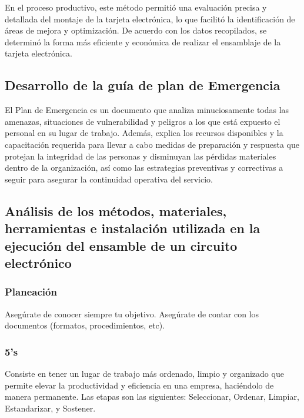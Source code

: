     En el proceso productivo, este método permitió una evaluación precisa y detallada del montaje de la tarjeta electrónica, lo que facilitó la identificación de áreas de mejora y optimización. De acuerdo con los datos recopilados, se determinó la forma más eficiente y económica de realizar el ensamblaje de la tarjeta electrónica.
    \subsection{Desarrollo de la guía de plan de Emergencia}
    
    El Plan de Emergencia es un documento que analiza minuciosamente todas las amenazas, situaciones de vulnerabilidad y peligros a los que está expuesto el personal en su lugar de trabajo. Además, explica los recursos disponibles y la capacitación requerida para llevar a cabo medidas de preparación y respuesta que protejan la integridad de las personas y disminuyan las pérdidas materiales dentro de la organización, así como las estrategias preventivas y correctivas a seguir para asegurar la continuidad operativa del servicio.
    \subsection{Análisis de los métodos, materiales, herramientas e instalación utilizada en la ejecución del ensamble de un circuito electrónico}
    
    \subsubsection{Planeación}
    
    Asegúrate de conocer siempre tu objetivo.
    Asegúrate de contar con los documentos (formatos, procedimientos, etc).
    \subsubsection{5's}
    
    Consiste en tener un lugar de trabajo
    más ordenado, limpio y organizado que
    permite elevar la productividad y
    eficiencia en una empresa, haciéndolo de manera permanente.
    Las etapas son las siguientes: Seleccionar, Ordenar, Limpiar, Estandarizar, y Sostener.
